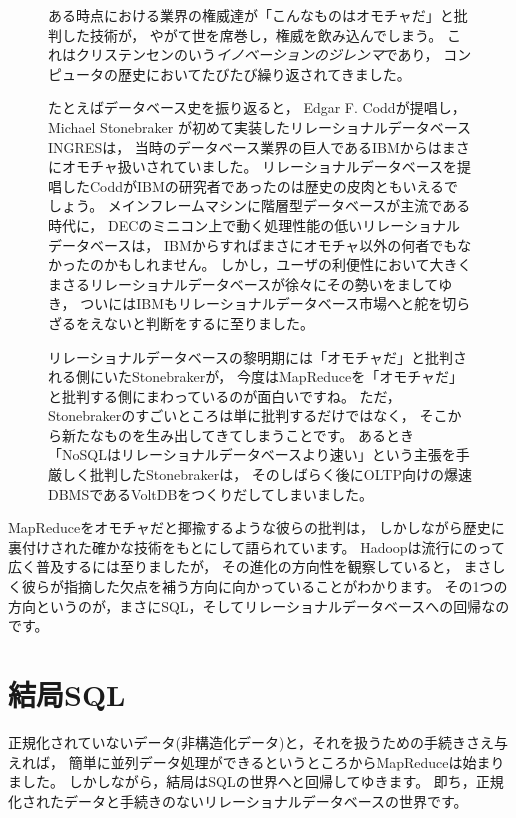 \begin{figure}[t]
\begin{screen}
 \vspace*{3mm}

 ある時点における業界の権威達が「こんなものはオモチャだ」と批判した技術が，
 やがて世を席巻し，権威を飲み込んでしまう。
 これはクリステンセンのいう{\em イノベーションのジレンマ}であり，
 コンピュータの歴史においてたびたび繰り返されてきました。

 たとえばデータベース史を振り返ると，
 Edgar F. Coddが提唱し，
 Michael Stonebraker が初めて実装したリレーショナルデータベースINGRESは，
 当時のデータベース業界の巨人であるIBMからはまさにオモチャ扱いされていました。
 リレーショナルデータベースを提唱したCoddがIBMの研究者であったのは歴史の皮肉ともいえるでしょう。
 メインフレームマシンに階層型データベースが主流である時代に，
 DECのミニコン上で動く処理性能の低いリレーショナルデータベースは，
 IBMからすればまさにオモチャ以外の何者でもなかったのかもしれません。
 しかし，ユーザの利便性において大きくまさるリレーショナルデータベースが徐々にその勢いをましてゆき，
 ついにはIBMもリレーショナルデータベース市場へと舵を切らざるをえないと判断をするに至りました。

 リレーショナルデータベースの黎明期には「オモチャだ」と批判される側にいたStonebrakerが，
 今度はMapReduceを「オモチャだ」と批判する側にまわっているのが面白いですね。
 ただ，Stonebrakerのすごいところは単に批判するだけではなく，
 そこから新たなものを生み出してきてしまうことです。
 あるとき「NoSQLはリレーショナルデータベースより速い」という主張を手厳しく批判したStonebrakerは，
 そのしばらく後にOLTP向けの爆速DBMSであるVoltDBをつくりだしてしまいました。
\end{screen}
\end{figure}

MapReduceをオモチャだと揶揄するような彼らの批判は，
しかしながら歴史に裏付けされた確かな技術をもとにして語られています。
Hadoopは流行にのって広く普及するには至りましたが，
その進化の方向性を観察していると，
まさしく彼らが指摘した欠点を補う方向に向かっていることがわかります。
その1つの方向というのが，まさにSQL，そしてリレーショナルデータベースへの回帰なのです。

\section{結局SQL}

正規化されていないデータ(非構造化データ)と，それを扱うための手続きさえ与えれば，
簡単に並列データ処理ができるというところからMapReduceは始まりました。
しかしながら，結局はSQLの世界へと回帰してゆきます。
即ち，正規化されたデータと手続きのないリレーショナルデータベースの世界です。

